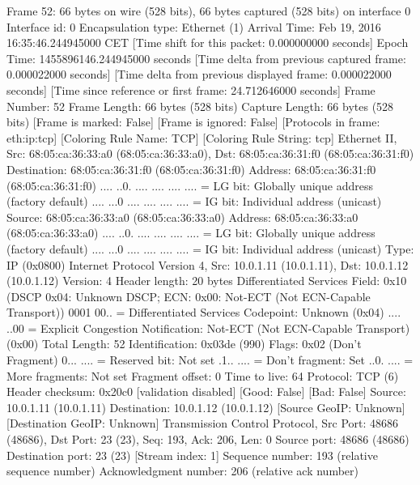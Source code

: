 Frame 52: 66 bytes on wire (528 bits), 66 bytes captured (528 bits) on interface 0
    Interface id: 0
    Encapsulation type: Ethernet (1)
    Arrival Time: Feb 19, 2016 16:35:46.244945000 CET
    [Time shift for this packet: 0.000000000 seconds]
    Epoch Time: 1455896146.244945000 seconds
    [Time delta from previous captured frame: 0.000022000 seconds]
    [Time delta from previous displayed frame: 0.000022000 seconds]
    [Time since reference or first frame: 24.712646000 seconds]
    Frame Number: 52
    Frame Length: 66 bytes (528 bits)
    Capture Length: 66 bytes (528 bits)
    [Frame is marked: False]
    [Frame is ignored: False]
    [Protocols in frame: eth:ip:tcp]
    [Coloring Rule Name: TCP]
    [Coloring Rule String: tcp]
Ethernet II, Src: 68:05:ca:36:33:a0 (68:05:ca:36:33:a0), Dst: 68:05:ca:36:31:f0 (68:05:ca:36:31:f0)
    Destination: 68:05:ca:36:31:f0 (68:05:ca:36:31:f0)
        Address: 68:05:ca:36:31:f0 (68:05:ca:36:31:f0)
        .... ..0. .... .... .... .... = LG bit: Globally unique address (factory default)
        .... ...0 .... .... .... .... = IG bit: Individual address (unicast)
    Source: 68:05:ca:36:33:a0 (68:05:ca:36:33:a0)
        Address: 68:05:ca:36:33:a0 (68:05:ca:36:33:a0)
        .... ..0. .... .... .... .... = LG bit: Globally unique address (factory default)
        .... ...0 .... .... .... .... = IG bit: Individual address (unicast)
    Type: IP (0x0800)
Internet Protocol Version 4, Src: 10.0.1.11 (10.0.1.11), Dst: 10.0.1.12 (10.0.1.12)
    Version: 4
    Header length: 20 bytes
    Differentiated Services Field: 0x10 (DSCP 0x04: Unknown DSCP; ECN: 0x00: Not-ECT (Not ECN-Capable Transport))
        0001 00.. = Differentiated Services Codepoint: Unknown (0x04)
        .... ..00 = Explicit Congestion Notification: Not-ECT (Not ECN-Capable Transport) (0x00)
    Total Length: 52
    Identification: 0x03de (990)
    Flags: 0x02 (Don't Fragment)
        0... .... = Reserved bit: Not set
        .1.. .... = Don't fragment: Set
        ..0. .... = More fragments: Not set
    Fragment offset: 0
    Time to live: 64
    Protocol: TCP (6)
    Header checksum: 0x20c0 [validation disabled]
        [Good: False]
        [Bad: False]
    Source: 10.0.1.11 (10.0.1.11)
    Destination: 10.0.1.12 (10.0.1.12)
    [Source GeoIP: Unknown]
    [Destination GeoIP: Unknown]
Transmission Control Protocol, Src Port: 48686 (48686), Dst Port: 23 (23), Seq: 193, Ack: 206, Len: 0
    Source port: 48686 (48686)
    Destination port: 23 (23)
    [Stream index: 1]
    Sequence number: 193    (relative sequence number)
    Acknowledgment number: 206    (relative ack number)
